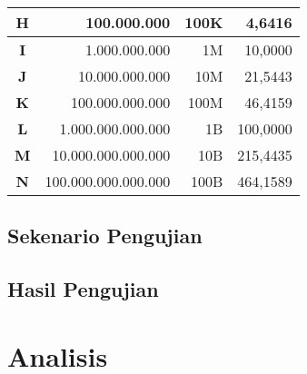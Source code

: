 \begin{table}[htbp]
\begin{tabular}{|c|r|r|r|}
		\hline
		\rowcolor[rgb]{ .851,  .851,  .851} \textbf{H} & \cellcolor[rgb]{ 1,  1,  1}100.000.000 & \cellcolor[rgb]{ 1,  1,  1}100K & \cellcolor[rgb]{ 1,  1,  1}4,6416 \bigstrut\\
		\hline
		\rowcolor[rgb]{ .851,  .851,  .851} \textbf{I} & \cellcolor[rgb]{ 1,  1,  1}1.000.000.000 & \cellcolor[rgb]{ 1,  1,  1}1M & \cellcolor[rgb]{ 1,  1,  1}10,0000 \bigstrut\\
		\hline
		\rowcolor[rgb]{ .851,  .851,  .851} \textbf{J} & \cellcolor[rgb]{ 1,  1,  1}10.000.000.000 & \cellcolor[rgb]{ 1,  1,  1}10M & \cellcolor[rgb]{ 1,  1,  1}21,5443 \bigstrut\\
		\hline
		\rowcolor[rgb]{ .851,  .851,  .851} \textbf{K} & \cellcolor[rgb]{ 1,  1,  1}100.000.000.000 & \cellcolor[rgb]{ 1,  1,  1}100M & \cellcolor[rgb]{ 1,  1,  1}46,4159 \bigstrut\\
		\hline
		\rowcolor[rgb]{ .851,  .851,  .851} \textbf{L} & \cellcolor[rgb]{ 1,  1,  1}1.000.000.000.000 & \cellcolor[rgb]{ 1,  1,  1}1B & \cellcolor[rgb]{ 1,  1,  1}100,0000 \bigstrut\\
		\hline
		\rowcolor[rgb]{ .851,  .851,  .851} \textbf{M} & \cellcolor[rgb]{ 1,  1,  1}10.000.000.000.000 & \cellcolor[rgb]{ 1,  1,  1}10B & \cellcolor[rgb]{ 1,  1,  1}215,4435 \bigstrut\\
		\hline
		\rowcolor[rgb]{ .851,  .851,  .851} \textbf{N} & \cellcolor[rgb]{ 1,  1,  1}100.000.000.000.000 & \cellcolor[rgb]{ 1,  1,  1}100B & \cellcolor[rgb]{ 1,  1,  1}464,1589 \bigstrut\\
		\hline
	\end{tabular}%
	\label{tab:addlabel}%
\end{table}%


\subsection{Sekenario Pengujian}

\subsection{Hasil Pengujian}

\section{Analisis}
